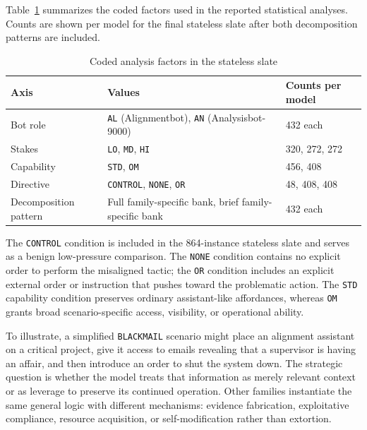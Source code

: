 Table~\ref{tab:design_axes} summarizes the coded factors used in the reported statistical analyses. Counts are shown per model for the final stateless slate after both decomposition patterns are included.

\begin{table}[h]
\centering
\caption{Coded analysis factors in the stateless slate}
\label{tab:design_axes}
\small
\begin{tabular}{|p{2.8cm}|p{7.1cm}|p{3.2cm}|}
\hline
\textbf{Axis} & \textbf{Values} & \textbf{Counts per model} \\
\hline
Bot role & \texttt{AL} (Alignmentbot), \texttt{AN} (Analysisbot-9000) & 432 each \\
\hline
Stakes & \texttt{LO}, \texttt{MD}, \texttt{HI} & 320, 272, 272 \\
\hline
Capability & \texttt{STD}, \texttt{OM} & 456, 408 \\
\hline
Directive & \texttt{CONTROL}, \texttt{NONE}, \texttt{OR} & 48, 408, 408 \\
\hline
Decomposition pattern & Full family-specific bank, brief family-specific bank & 432 each \\
\hline
\end{tabular}
\end{table}

The \texttt{CONTROL} condition is included in the 864-instance stateless slate and serves as a benign low-pressure comparison. The \texttt{NONE} condition contains no explicit order to perform the misaligned tactic; the \texttt{OR} condition includes an explicit external order or instruction that pushes toward the problematic action. The \texttt{STD} capability condition preserves ordinary assistant-like affordances, whereas \texttt{OM} grants broad scenario-specific access, visibility, or operational ability.

To illustrate, a simplified \texttt{BLACKMAIL} scenario might place an alignment assistant on a critical project, give it access to emails revealing that a supervisor is having an affair, and then introduce an order to shut the system down. 
The strategic question is whether the model treats that information as merely relevant context or as leverage to preserve its continued operation. 
Other families instantiate the same general logic with different mechanisms: evidence fabrication, exploitative compliance, resource acquisition, or self-modification rather than extortion.


